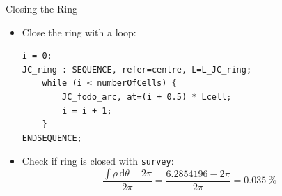\documentclass{beamer}
\begin{document}
%
%
%

\begin{frame}[t,fragile]{Closing the Ring}
\begin{itemize}
\item Close the ring with a loop:
\begin{lstlisting}
i = 0;
JC_ring : SEQUENCE, refer=centre, L=L_JC_ring; 
    while (i < numberOfCells) {
        JC_fodo_arc, at=(i + 0.5) * Lcell;
        i = i + 1;
    }
ENDSEQUENCE;
\end{lstlisting}
\item Check if ring is closed with \texttt{survey}:
\begin{equation*}
\frac{\int\rho\,\text{d}\theta-2\pi}{2\pi}=\frac{\num{6.2854196}-2\pi}{2\pi}=\SI{0.035}{\percent}
\end{equation*}
\end{itemize}
\end{frame}
\end{document}
